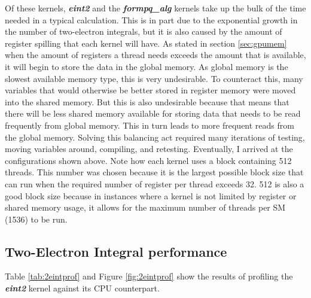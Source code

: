 \documentclass[12pt]{report}
\newcommand{\kernel}[1]{\textit{\textbf{#1}}}
\begin{document}
Of these kernels, \kernel{eint2} and the \kernel{formpq\_alg} kernels take up the bulk of the time needed in a typical calculation. This is in part due to the exponential growth in the number of two-electron integrals, but it is also caused by the amount of register spilling that each kernel will have. As stated in section \ref{sec:gpumem} when the amount of registers a thread needs exceeds the amount that is available, it will begin to store the data in the global memory. As global memory is the slowest available memory type, this is very undesirable. To counteract this, many variables that would otherwise be better stored in register memory were moved into the shared memory. But this is also undesirable because that means that there will be less shared memory available for storing data that needs to be read frequently from global memory. This in turn leads to more frequent reads from the global memory. Solving this balancing act required many iterations of testing, moving variables around, compiling, and retesting. Eventually, I arrived at the configurations shown above. Note how each kernel uses a block containing 512 threads. This number was chosen because it is the largest possible block size that can run when the required number of register per thread exceeds 32. 512 is also a good block size because in instances where a kernel is not limited by register or shared memory usage, it allows for the maximum number of threads per SM (1536) to be run.

\subsection{Two-Electron Integral performance}
Table \ref{tab:2eintprof} and Figure \ref{fig:2eintprof} show the results of profiling the \kernel{eint2} kernel against its CPU counterpart.
\end{document}
